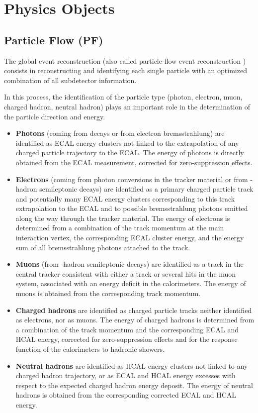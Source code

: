\chapter{Physics Objects}


\section{Particle Flow (PF) }

The global event reconstruction (also called particle-flow event reconstruction \cite{PF1, PF2, PF3}) consists in reconstructing and identifying each single particle with an optimized combination of all subdetector information.

In this process, the identification of the particle type (photon, electron, muon, charged hadron, neutral hadron) plays an important role in the determination of the particle direction and energy.
 
\begin{itemize}
 \item \textbf{Photons}
(\eg coming from \Pgpz  decays or from electron bremsstrahlung) are identified as ECAL energy clusters not linked to the extrapolation of any charged particle trajectory to the ECAL. The energy of photons is directly obtained from the ECAL measurement, corrected for zero-suppression effects.

\item \textbf{Electrons} 
(\eg coming from photon conversions in the tracker material or from \cPqb-hadron semileptonic decays) are identified as a primary charged particle track and potentially many ECAL energy clusters corresponding to this track extrapolation to the ECAL and to possible bremsstrahlung photons emitted along the way through the tracker material. The energy of electrons is determined from a combination of the track momentum at the main interaction vertex, the corresponding ECAL cluster energy, and the energy sum of all bremsstrahlung photons attached to the track.

\item \textbf{Muons}
 (\eg from \cPqb-hadron semileptonic decays) are identified as a track in the central tracker consistent with either a track or several hits in the muon system, associated with an energy deficit in the calorimeters. The energy of muons is obtained from the corresponding track momentum.
 
\item \textbf{Charged hadrons} 
are identified as charged particle tracks neither identified as electrons, nor as muons. The energy of charged hadrons is determined from a combination of the track momentum and the corresponding ECAL and HCAL energy, corrected for zero-suppression effects and for the response function of the calorimeters to hadronic showers.

\item \textbf{Neutral hadrons}
are identified as HCAL energy clusters not linked to any charged hadron trajectory, or as ECAL and HCAL energy excesses with respect to the expected charged hadron energy deposit. The energy of neutral hadrons is obtained from the corresponding corrected ECAL and HCAL energy.
\end{itemize}

